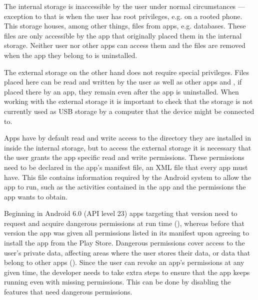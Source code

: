 The internal storage is inaccessible by the user under normal circumstances --- exception to that is when the user has root privileges, e.g. on a rooted phone. This storage houses, among other things, files from apps, e.g. databases. These files are only accessible by the app that originally placed them in the internal storage. Neither user nor other apps can access them and the files are removed when the app they belong to is uninstalled.

The external storage on the other hand does not require special privileges. Files placed here can be read and written by the user as well as other apps and , if placed there by an app, they remain even after the app is uninstalled. When working with the external storage it is important to check that the storage is not currently used as \gls{USB} storage by a computer that the device might be connected to.

Apps have by default read and write access to the directory they are installed in inside the internal storage, but to access the external storage it is necessary that the user grants the app specific read and write permissions. These permissions need to be declared in the app's manifest file, an \gls{XML} file that every app must have. This file contains information required by the Android system to allow the app to run, such as the activities contained in the app and the permissions the app wants to obtain.

Beginning in Android 6.0 (\gls{API} level 23) apps targeting that version need to request and acquire dangerous permissions at run time (\cite{android_permissions}), whereas before that version the app was given all permissions listed in its manifest upon agreeing to install the app from the Play Store. Dangerous permissions cover access to the user's private data, affecting areas where the user stores their data, or data that belong to other apps (\cite{android_permissions}). Since the user can revoke an app's permissions at any given time, the developer needs to take extra steps to ensure that the app keeps running even with missing permissions. This can be done by disabling the features that need dangerous permissions.
